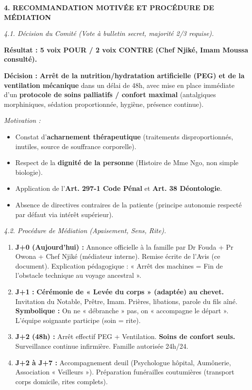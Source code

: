 \documentclass[11pt]{article}
\begin{document}
\begin{exoresolu}
\noindent\textbf{4. RECOMMANDATION MOTIVÉE ET PROCÉDURE DE MÉDIATION}\par
\emph{4.1. Décision du Comité (Vote à bulletin secret, majorité 2/3 requise).}\par
\textbf{Résultat : 5 voix POUR / 2 voix CONTRE (Chef Njiké, Imam Moussa consulté).}\par
\textbf{Décision :} \textbf{Arrêt de la nutrition/hydratation artificielle (PEG) et de la ventilation mécanique} dans un délai de 48h, avec mise en place immédiate d'un \textbf{protocole de soins palliatifs / confort maximal} (antalgiques morphiniques, sédation proportionnée, hygiène, présence continue).\par
\emph{Motivation :} 
\begin{itemize}
    \item Constat d'\textbf{acharnement thérapeutique} (traitements disproportionnés, inutiles, source de souffrance corporelle).
    \item Respect de la \textbf{dignité de la personne} (Histoire de Mme Ngo, non simple biologie).
    \item Application de l'\textbf{Art. 297-1 Code Pénal} et \textbf{Art. 38 Déontologie}.
    \item Absence de directives contraires de la patiente (principe autonomie respecté par défaut via intérêt supérieur).
\end{itemize}
\emph{4.2. Procédure de Médiation (Apaisement, Sens, Rite).}\par
\begin{enumerate}
    \item \textbf{J+0 (Aujourd'hui) :} Annonce officielle à la famille par Dr Fouda + Pr Owona + Chef Njiké (médiateur interne). Remise écrite de l'Avis (ce document). Explication pédagogique : « Arrêt des machines = Fin de l'obstacle technique au voyage ancestral ».
    \item \textbf{J+1 :} \textbf{Cérémonie de « Levée du corps » (adaptée) au chevet.} Invitation du Notable, Prêtre, Imam. Prières, libations, parole du fils aîné. \textbf{Symbolique :} On ne « débranche » pas, on « accompagne le départ ». L'équipe soignante participe (soin = rite).
    \item \textbf{J+2 (48h) :} Arrêt effectif PEG + Ventilation. \textbf{Soins de confort seuls.} Surveillance continue infirmière. Famille autorisée 24h/24.
    \item \textbf{J+2 à J+7 :} Accompagnement deuil (Psychologue hôpital, Aumônerie, Association « Veilleurs »). Préparation funérailles coutumières (transport corps domicile, rites complets).

\end{enumerate}
\end{exoresolu}
\end{document}
